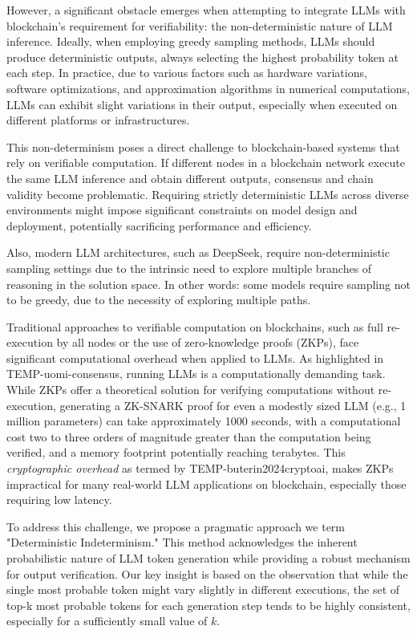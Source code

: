 \documentclass{article}
\begin{document}
However, a significant obstacle emerges when attempting to integrate LLMs with blockchain's requirement for verifiability: the non-deterministic nature of LLM inference.  Ideally, when employing greedy sampling methods, LLMs should produce deterministic outputs, always selecting the highest probability token at each step.  In practice, due to various factors such as hardware variations, software optimizations, and approximation algorithms in numerical computations, LLMs can exhibit slight variations in their output, especially when executed on different platforms or infrastructures.

This non-determinism poses a direct challenge to blockchain-based systems that rely on verifiable computation.  If different nodes in a blockchain network execute the same LLM inference and obtain different outputs, consensus and chain validity become problematic.  Requiring strictly deterministic LLMs across diverse environments might impose significant constraints on model design and deployment, potentially sacrificing performance and efficiency.

Also, modern LLM architectures, such as DeepSeek, require non-deterministic sampling settings due to the intrinsic need to explore multiple branches of reasoning in the solution space. In other words: some models require sampling not to be greedy, due to the necessity of exploring multiple paths.

Traditional approaches to verifiable computation on blockchains, such as full re-execution by all nodes or the use of zero-knowledge proofs (ZKPs), face significant computational overhead when applied to LLMs. As highlighted in TEMP-uomi-consensus, running LLMs is a computationally demanding task.
While ZKPs offer a theoretical solution for verifying computations without re-execution, generating a ZK-SNARK proof for even a modestly sized LLM (e.g., 1 million parameters) can take approximately 1000 seconds, with a computational cost two to three orders of magnitude greater than the computation being verified, and a memory footprint potentially reaching terabytes.  This \textit{cryptographic overhead} as termed by TEMP-buterin2024cryptoai, makes ZKPs impractical for many real-world LLM applications on blockchain, especially those requiring low latency.

To address this challenge, we propose a pragmatic approach we term "Deterministic Indeterminism."  This method acknowledges the inherent probabilistic nature of LLM token generation while providing a robust mechanism for output verification.  Our key insight is based on the observation that while the single most probable token might vary slightly in different executions, the set of top-k most probable tokens for each generation step tends to be highly consistent, especially for a sufficiently small value of $k$.
\end{document}
